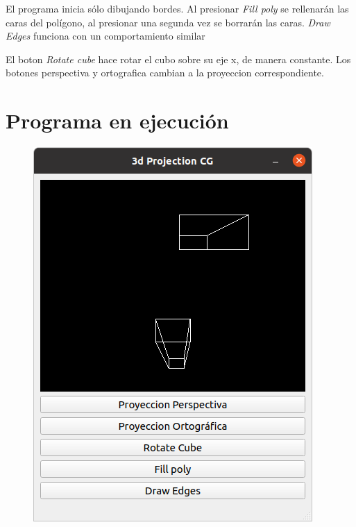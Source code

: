 \documentclass[12pt]{article}
\begin{document}
El programa inicia sólo dibujando bordes. Al presionar \textit{Fill poly} se rellenarán las caras del polígono, al presionar una segunda vez se borrarán las caras. \textit{Draw Edges} funciona con un comportamiento similar


El boton \textit{Rotate cube} hace rotar el cubo sobre su eje x, de manera constante.
Los botones perspectiva y ortografica cambian a la proyeccion correspondiente.




\section{Programa en ejecución}

\begin{figure}[H]
\centering
\includegraphics[scale=0.5]{images/gui.png}

\end{figure}
\end{document}
